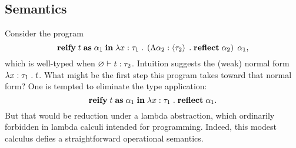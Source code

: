   \subsection{Semantics}

    Consider the program
    \[
      \textbf{reify} \; t \; \textbf{as} \; \alpha_1 \; \textbf{in} \; \lambda x : \tau_1 \; . \; \left( \Lambda \alpha_2 : \left\langle \tau_2 \right\rangle \; . \; \textbf{reflect} \; \alpha_2 \right) \; \alpha_1,
    \]
    which is well-typed when $\varnothing \vdash t : \tau_2$. Intuition suggests the (weak) normal form $\lambda x : \tau_1 \; . \; t$. What might be the first step this program takes toward that normal form? One is tempted to eliminate the type application:
    \[
      \textbf{reify} \; t \; \textbf{as} \; \alpha_1 \; \textbf{in} \; \lambda x : \tau_1 \; . \; \textbf{reflect} \; \alpha_1.
    \]
    But that would be reduction under a lambda abstraction, which ordinarily forbidden in lambda calculi intended for programming. Indeed, this modest calculus defies a straightforward operational semantics.
